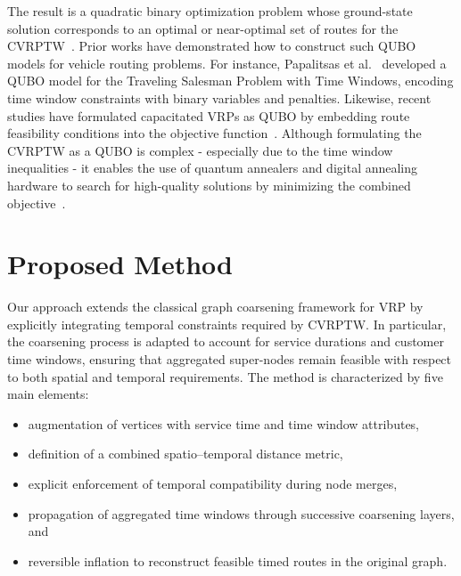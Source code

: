 \documentclass[conference]{IEEEtran}
\begin{document}
The result is a quadratic binary optimization problem whose ground-state solution corresponds to an optimal or near-optimal set of routes for the CVRPTW~\cite{papalitsas2019}. Prior works have demonstrated how to construct such QUBO models for vehicle routing problems. For instance, Papalitsas et al.~\cite{papalitsas2019} developed a QUBO model for the Traveling Salesman Problem with Time Windows, encoding time window constraints with binary variables and penalties. Likewise, recent studies have formulated capacitated VRPs as QUBO by embedding route feasibility conditions into the objective function~\cite{borowski2020}. Although formulating the CVRPTW as a QUBO is complex - especially due to the time window inequalities - it enables the use of quantum annealers and digital annealing hardware to search for high-quality solutions by minimizing the combined objective~\cite{holliday2025}. 


\section{Proposed Method}

Our approach extends the classical graph coarsening framework for VRP by explicitly integrating temporal constraints required by CVRPTW. In particular, the coarsening process is adapted to account for service durations and customer time windows, ensuring that aggregated super-nodes remain feasible with respect to both spatial and temporal requirements. The method is characterized by five main elements:
\begin{itemize}
  \item augmentation of vertices with service time and time window attributes,
  \item definition of a combined spatio--temporal distance metric,
  \item explicit enforcement of temporal compatibility during node merges,
  \item propagation of aggregated time windows through successive coarsening layers, and
  \item reversible inflation to reconstruct feasible timed routes in the original graph.
\end{itemize}
\end{document}
